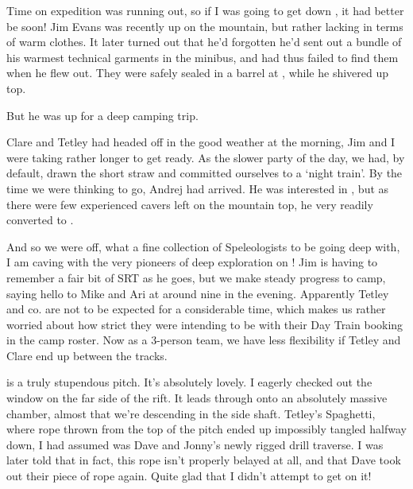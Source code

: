 Time on expedition was running out, so if I was going to get down
, it had better be soon! Jim Evans was
recently up on the mountain, but rather lacking in terms of warm
clothes. It later turned out that he'd forgotten he'd sent out a bundle
of his warmest technical garments in the minibus, and had thus failed to
find them when he flew out. They were safely sealed in a barrel at
, while he shivered up top.

But he was up for a deep camping trip.

Clare and Tetley had headed off in the good weather at the morning, Jim
and I were taking rather longer to get ready. As the slower party of the
day, we had, by default, drawn the short straw and committed ourselves
to a `night train'. By the time we were thinking to go, Andrej had
arrived. He was interested in , but as there were few
experienced cavers left on the mountain top, he very readily converted
to .

And so we were off, what a fine collection of Speleologists to be going
deep with, I am caving with the very pioneers of deep exploration on
! Jim is having to remember a fair bit of SRT as he goes, but we
make steady progress to camp, saying hello to Mike and Ari at around nine
in the evening. Apparently Tetley and co. are not to be expected for a
considerable time, which makes us rather worried about how strict they
were intending to be with their Day Train booking in the camp roster.
Now as a 3-person team, we have less flexibility if Tetley and Clare end
up between the tracks.


 is a truly stupendous pitch. It's absolutely lovely. I eagerly
checked out the window on the far side of the rift. It leads through
onto an absolutely massive chamber, almost that we're descending in the
side shaft. Tetley's Spaghetti, where rope thrown from the top of the
pitch ended up impossibly tangled halfway down, I had assumed was Dave
and Jonny's newly rigged drill traverse. I was later told that in fact,
this rope isn't properly belayed at all, and that Dave took out their
piece of rope again. Quite glad that I didn't attempt to get on it!

